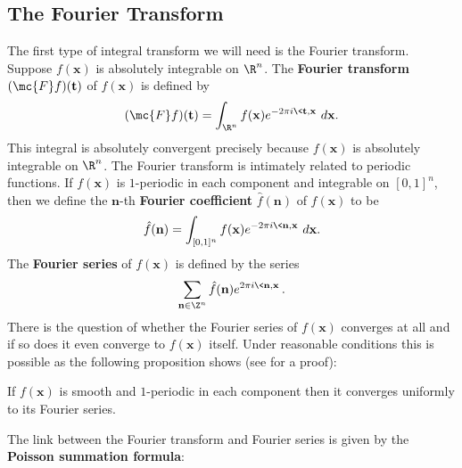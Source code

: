     \subsection*{The Fourier Transform}
      The first type of integral transform we will need is the Fourier transform. Suppose $f(\mathbf{x})$ is absolutely integrable on $\R^{n}$. The \textbf{Fourier transform} $(\mc{F}f)(\mathbf{t})$ of $f(\mathbf{x})$ is defined by
      \[
        (\mc{F}f)(\mathbf{t}) = \int_{\R^{n}}f(\mathbf{x})e^{-2\pi i\<\mathbf{t},\mathbf{x}\>}\,d\mathbf{x}.
      \]
      This integral is absolutely convergent precisely because $f(\mathbf{x})$ is absolutely integrable on $\R^{n}$. The Fourier transform is intimately related to periodic functions. If $f(\mathbf{x})$ is $1$-periodic in each component and integrable on $[0,1]^{n}$, then we define the $\mathbf{n}$-th \textbf{Fourier coefficient} $\hat{f}(\mathbf{n})$ of $f(\mathbf{x})$ to be
    \[
      \hat{f}(\mathbf{n}) = \int_{[0,1]^{n}}f(\mathbf{x})e^{-2\pi i\<\mathbf{n},\mathbf{x}\>}\,d\mathbf{x}.
    \]
    The \textbf{Fourier series} of $f(\mathbf{x})$ is defined by the series
    \[
      \sum_{\mathbf{n} \in \Z^{n}}\hat{f}(\mathbf{n})e^{2\pi i\<\mathbf{n},\mathbf{x}\>}.
    \]
    There is the question of whether the Fourier series of $f(\mathbf{x})$ converges at all and if so does it even converge to $f(\mathbf{x})$ itself. Under reasonable conditions this is possible as the following proposition shows (see \cite{grafakos2008classical} for a proof):

    \begin{proposition}
      If $f(\mathbf{x})$ is smooth and $1$-periodic in each component then it converges uniformly to its Fourier series.
    \end{proposition}

    The link between the Fourier transform and Fourier series is given by the \textbf{Poisson summation formula}:

